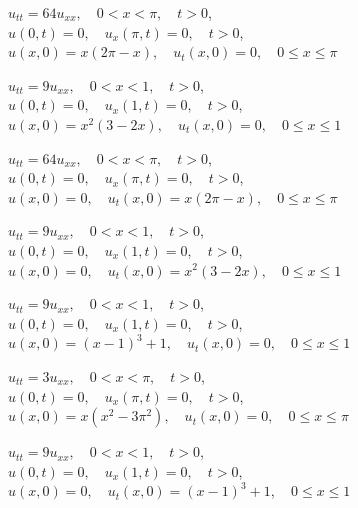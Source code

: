 \begin{exerciselist}

\item\label{exer:12.2.35}$u_{tt}=64u_{xx},\quad 0<x<\pi,\quad t>0$,\\
$u(0,t)=0,\quad u_x(\pi,t)=0,\quad t>0$,\\
$u(x,0)=x(2\pi-x),\quad u_t(x,0)=0,\quad0\le x\le \pi$

\item\label{exer:12.2.36}$u_{tt}=9u_{xx},\quad 0<x<1,\quad t>0$,\\
$u(0,t)=0,\quad u_x(1,t)=0,\quad t>0$,\\
$u(x,0)=x^2(3-2x),\quad u_t(x,0)=0,\quad0\le x\le 1$

\item\label{exer:12.2.37}$u_{tt}=64u_{xx},\quad 0<x<\pi,\quad t>0$,\\
$u(0,t)=0,\quad u_x(\pi,t)=0,\quad t>0$,\\
$u(x,0)=0,\quad u_t(x,0)=x(2\pi-x),\quad0\le x\le \pi$


\item\label{exer:12.2.38}\Cex
$u_{tt}=9u_{xx},\quad 0<x<1,\quad t>0$,\\
$u(0,t)=0,\quad u_x(1,t)=0,\quad t>0$,\\
$u(x,0)=0,\quad u_t(x,0)=x^2(3-2x),\quad0\le x\le 1$

\item\label{exer:12.2.39}$u_{tt}=9u_{xx},\quad 0<x<1,\quad t>0$,\\
$u(0,t)=0,\quad u_x(1,t)=0,\quad t>0$,\\
$u(x,0)=(x-1)^3+1,\quad u_t(x,0)=0,\quad0\le x\le 1$


\item\label{exer:12.2.40}$u_{tt}=3u_{xx},\quad 0<x<\pi,\quad t>0$,\\
$u(0,t)=0,\quad u_x(\pi,t)=0,\quad t>0$,\\
$u(x,0)=x(x^2-3\pi^2),\quad u_t(x,0)=0,\quad0\le x\le\pi$

\item\label{exer:12.2.41}$u_{tt}=9u_{xx},\quad 0<x<1,\quad t>0$,\\
$u(0,t)=0,\quad u_x(1,t)=0,\quad t>0$,\\
$u(x,0)=0,\quad u_t(x,0)=(x-1)^3+1,\quad0\le x\le 1$






\end{exerciselist}
